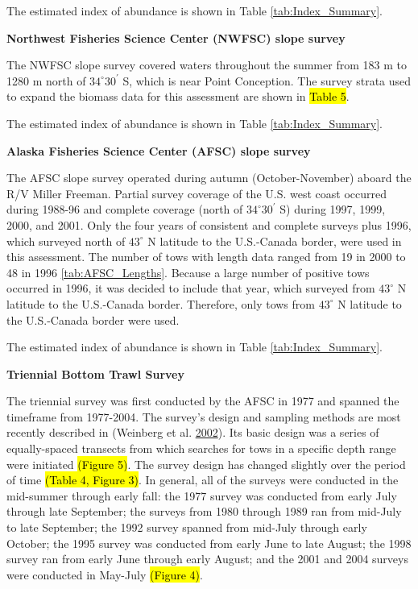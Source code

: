 \documentclass[12pt,]{article}
\begin{document}
The estimated index of abundance is shown in Table
\ref{tab:Index_Summary}.

\textbf{Northwest Fisheries Science Center (NWFSC) slope survey}

The NWFSC slope survey covered waters throughout the summer from 183 m
to 1280 m north of \(34^\circ 30^\prime\) S, which is near Point
Conception. The survey strata used to expand the biomass data for this
assessment are shown in \hl{Table 5}.

The estimated index of abundance is shown in Table
\ref{tab:Index_Summary}.

\textbf{Alaska Fisheries Science Center (AFSC) slope survey}

The AFSC slope survey operated during autumn (October-November) aboard
the R/V Miller Freeman. Partial survey coverage of the U.S. west coast
occurred during 1988-96 and complete coverage (north of
\(34^\circ 30^\prime\) S) during 1997, 1999, 2000, and 2001. Only the
four years of consistent and complete surveys plus 1996, which surveyed
north of \(43^\circ\) N latitude to the U.S.-Canada border, were used in
this assessment. The number of tows with length data ranged from 19 in
2000 to 48 in 1996 \ref{tab:AFSC_Lengths}. Because a large number of
positive tows occurred in 1996, it was decided to include that year,
which surveyed from \(43^\circ\) N latitude to the U.S.-Canada border.
Therefore, only tows from \(43^\circ\) N latitude to the U.S.-Canada
border were used.

The estimated index of abundance is shown in Table
\ref{tab:Index_Summary}.

\textbf{Triennial Bottom Trawl Survey}

The triennial survey was first conducted by the AFSC in 1977 and spanned
the timeframe from 1977-2004. The survey's design and sampling methods
are most recently described in (Weinberg et al.
\protect\hyperlink{ref-weinberg_estimation_2002}{2002}). Its basic
design was a series of equally-spaced transects from which searches for
tows in a specific depth range were initiated \hl{(Figure 5)}. The
survey design has changed slightly over the period of time
\hl{(Table 4, Figure 3)}. In general, all of the surveys were conducted
in the mid-summer through early fall: the 1977 survey was conducted from
early July through late September; the surveys from 1980 through 1989
ran from mid-July to late September; the 1992 survey spanned from
mid-July through early October; the 1995 survey was conducted from early
June to late August; the 1998 survey ran from early June through early
August; and the 2001 and 2004 surveys were conducted in May-July
\hl{(Figure 4)}.
\end{document}

